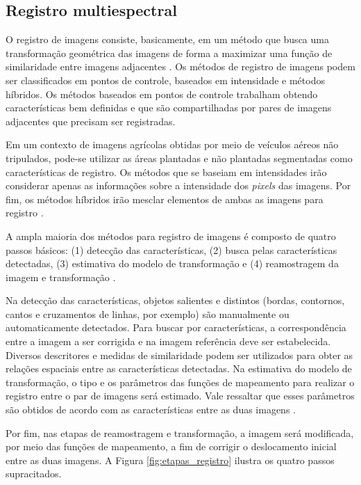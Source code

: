 \documentclass[12pt]{article}
\begin{document}
\subsection{Registro multiespectral}

O registro de imagens consiste, basicamente, em um método que busca uma transformação geométrica das imagens de forma a maximizar uma função de similaridade entre imagens adjacentes \cite{kumar2014survey}. Os métodos de registro de imagens podem ser classificados em pontos de controle, baseados em intensidade e métodos híbridos. Os métodos baseados em pontos de controle trabalham obtendo características bem definidas e que são compartilhadas por pares de imagens adjacentes que precisam ser registradas.

Em um contexto de imagens agrícolas obtidas por meio de veículos aéreos não tripulados, pode-se utilizar as áreas plantadas e não plantadas segmentadas como características de registro. Os métodos que se baseiam em intensidades irão considerar apenas as informações sobre a intensidade dos \textit{pixels} das imagens. Por fim, os métodos híbridos irão mesclar elementos de ambas as imagens para registro \cite{kumar2014survey}.

A ampla maioria dos métodos para registro de imagens é composto de quatro passos básicos: (1) detecção das características, (2) busca pelas características detectadas, (3) estimativa do modelo de transformação e (4) reamostragem da imagem e transformação \cite{Uchida2013ImagePA}.

Na detecção das características, objetos salientes e distintos (bordas, contornos, cantos e cruzamentos de linhas, por exemplo) são manualmente ou automaticamente detectados. Para buscar por características, a correspondência entre a imagem a ser corrigida e na imagem referência deve ser estabelecida. Diversos descritores e medidas de similaridade podem ser utilizados para obter as relações espaciais entre as características detectadas. Na estimativa do modelo de transformação, o tipo e os parâmetros das funções de mapeamento para realizar o registro entre o par de imagens será estimado. Vale ressaltar que esses parâmetros são obtidos de acordo com as características entre as duas imagens \cite{Uchida2013ImagePA}.  

Por fim, nas etapas de reamostragem e transformação, a imagem será modificada, por meio das funções de mapeamento, a fim de corrigir o deslocamento inicial entre as duas imagens. A Figura \ref{fig:etapas_registro} ilustra os quatro passos supracitados.
\end{document}
